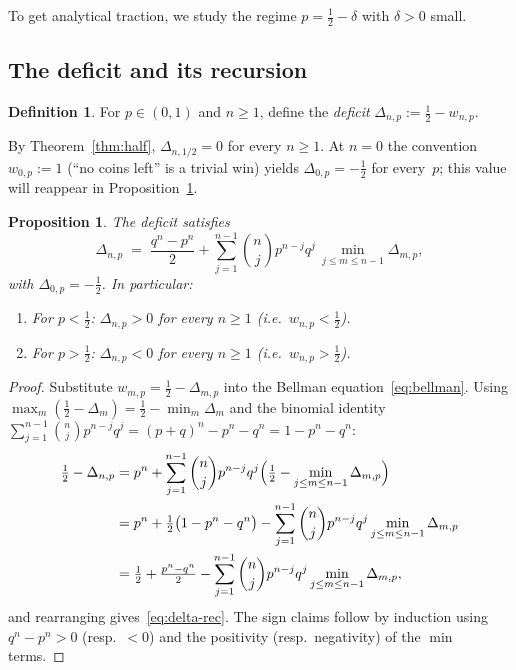 \documentclass[12pt]{article}
\newtheorem{proposition}[theorem]{Proposition}
\theoremstyle{definition}
\newtheorem{definition}[theorem]{Definition}
\theoremstyle{remark}
\begin{document}
To get analytical traction, we study the regime
$p=\tfrac12-\delta$ with $\delta>0$ small.

\subsection{The deficit and its recursion}

\begin{definition}\label{def:deficit}
  For $p\in(0,1)$ and $n\ge 1$, define the
  \emph{deficit}
  $\Delta_{n,p}:=\tfrac12-w_{n,p}$.
\end{definition}

By Theorem~\ref{thm:half}, $\Delta_{n,1/2}=0$ for every $n\ge 1$.
At $n=0$ the convention $w_{0,p}:=1$ (``no coins left'' is a
trivial win) yields $\Delta_{0,p}=-\tfrac12$ for every~$p$; this
value will reappear in Proposition~\ref{prop:delta-rec}.

\begin{proposition}\label{prop:delta-rec}
  The deficit satisfies
  \begin{equation}\label{eq:delta-rec}
    \Delta_{n,p} \;=\;
    \frac{q^n-p^n}{2}
    + \sum_{j=1}^{n-1}\binom{n}{j}p^{n-j}q^{j}\,
    \min_{j\le m\le n-1}\Delta_{m,p},
  \end{equation}
  with $\Delta_{0,p}=-\tfrac12$.
  In particular:
  \begin{enumerate}[\rm(i)]
  \item For $p<\tfrac12$: $\Delta_{n,p}>0$ for every $n\ge 1$
    (i.e.\ $w_{n,p}<\tfrac12$).
  \item For $p>\tfrac12$: $\Delta_{n,p}<0$ for every $n\ge 1$
    (i.e.\ $w_{n,p}>\tfrac12$).
  \end{enumerate}
\end{proposition}

\begin{proof}
  Substitute $w_{m,p}=\tfrac12-\Delta_{m,p}$ into the
  Bellman equation~\eqref{eq:bellman}.  Using
  $\max_m(\tfrac12-\Delta_m) = \tfrac12 - \min_m\Delta_m$ and the
  binomial identity $\sum_{j=1}^{n-1}\binom{n}{j}p^{n-j}q^j
  = (p+q)^n - p^n - q^n = 1 - p^n - q^n$:
  \begin{align*}
    \tfrac12 - \Delta_{n,p}
    &= p^n + \sum_{j=1}^{n-1}\binom{n}{j}p^{n-j}q^j
       \Bigl(\tfrac12 - \min_{j\le m\le n-1}\Delta_{m,p}\Bigr) \\
    &= p^n + \tfrac12\bigl(1 - p^n - q^n\bigr)
       - \sum_{j=1}^{n-1}\binom{n}{j}p^{n-j}q^j\min_{j\le m\le n-1}\Delta_{m,p} \\
    &= \tfrac12 + \tfrac{p^n - q^n}{2}
       - \sum_{j=1}^{n-1}\binom{n}{j}p^{n-j}q^j\min_{j\le m\le n-1}\Delta_{m,p},
  \end{align*}
  and rearranging gives~\eqref{eq:delta-rec}.
  The sign claims follow by induction using $q^n-p^n>0$ (resp.\ $<0$)
  and the positivity (resp.\ negativity) of the $\min$ terms.
\end{proof}
\end{document}
